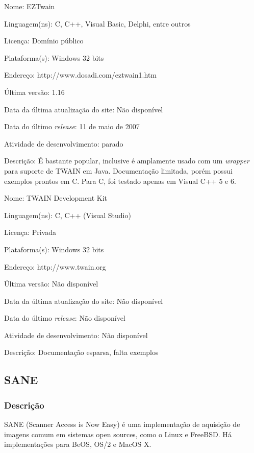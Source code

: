 \begin{description*}
	\item[Nome:] EZTwain
	\item[Linguagem(ns):] C, C++, Visual Basic, Delphi, entre outros
	\item[Licença:] Domínio público
	\item[Plataforma(s):] Windows 32 bits
	\item[Endereço:] http://www.dosadi.com/eztwain1.htm
	\item[Última versão:] 1.16
	\item[Data da última atualização do site:] Não disponível
	\item[Data do último {\it release}:] 11 de maio de 2007
	\item[Atividade de desenvolvimento:] parado
	\item[Descrição:] 
	É bastante popular, inclusive é amplamente usado com um {\it wrapper} para suporte de TWAIN em Java. Documentação limitada, porém possui exemplos prontos em C. Para C, foi testado apenas em Visual C++ 5 e 6.
\end{description*}

\begin{description*}
	\item[Nome:] TWAIN Development Kit
	\item[Linguagem(ns):] C, C++ (Visual Studio)
	\item[Licença:] Privada
	\item[Plataforma(s):] Windows 32 bits
	\item[Endereço:] http://www.twain.org
	\item[Última versão:] Não disponível
	\item[Data da última atualização do site:] Não disponível
	\item[Data do último {\it release}:] Não disponível
	\item[Atividade de desenvolvimento:] Não disponível
	\item[Descrição:] 
	Documentação esparsa, falta exemplos
\end{description*}


\subsection{SANE}
\label{sec:sane}

\subsubsection{Descrição}
SANE (Scanner Access is Now Easy) é uma implementação de aquisição de imagens comum em sistemas open sources, como o Linux e FreeBSD. Há implementações para BeOS, OS/2 e MacOS X.

